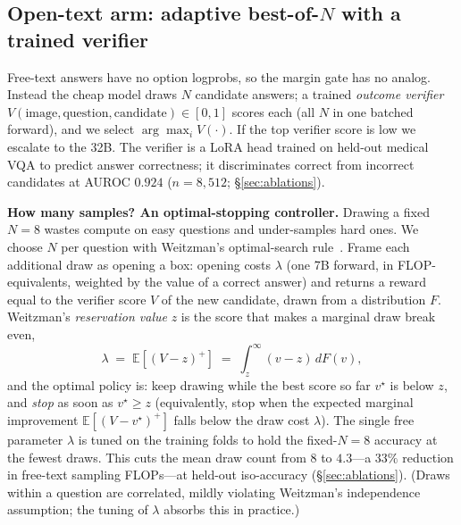 \documentclass[conference]{IEEEtran}
\begin{document}
\subsection{Open-text arm: adaptive best-of-$N$ with a trained verifier}
Free-text answers have no option logprobs, so the margin gate has no analog. Instead the cheap model draws $N$ candidate answers; a trained \emph{outcome verifier} $V(\text{image},\text{question},\text{candidate})\in[0,1]$ scores each (all $N$ in one batched forward), and we select $\arg\max_i V(\cdot)$. If the top verifier score is low we escalate to the 32B. The verifier is a LoRA head trained on held-out medical VQA to predict answer correctness; it discriminates correct from incorrect candidates at AUROC $0.924$ ($n{=}8{,}512$; \S\ref{sec:ablations}).

\textbf{How many samples? An optimal-stopping controller.} Drawing a fixed $N{=}8$ wastes compute on easy questions and under-samples hard ones. We choose $N$ per question with Weitzman's optimal-search rule~\cite{weitzman}. Frame each additional draw as opening a box: opening costs $\lambda$ (one 7B forward, in FLOP-equivalents, weighted by the value of a correct answer) and returns a reward equal to the verifier score $V$ of the new candidate, drawn from a distribution $F$. Weitzman's \emph{reservation value} $z$ is the score that makes a marginal draw break even,
\begin{equation}
\lambda \;=\; \mathbb{E}\!\left[(V-z)^{+}\right] \;=\; \int_{z}^{\infty}\!(v-z)\,dF(v), \label{eq:weitzman}
\end{equation}
and the optimal policy is: keep drawing while the best score so far $v^\star$ is below $z$, and \emph{stop} as soon as $v^\star \ge z$ (equivalently, stop when the expected marginal improvement $\mathbb{E}[(V-v^\star)^{+}]$ falls below the draw cost $\lambda$). The single free parameter $\lambda$ is tuned on the training folds to hold the fixed-$N{=}8$ accuracy at the fewest draws. This cuts the mean draw count from $8$ to $4.3$---a $33\%$ reduction in free-text sampling FLOPs---at held-out iso-accuracy (\S\ref{sec:ablations}). (Draws within a question are correlated, mildly violating Weitzman's independence assumption; the tuning of $\lambda$ absorbs this in practice.)
\end{document}

